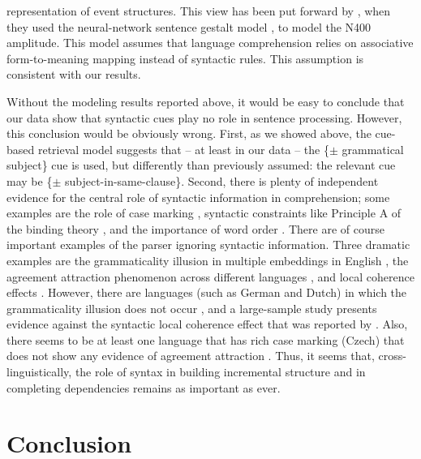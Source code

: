 \documentclass[a4paper, man, floatsintext]{apa7}
\begin{document}
representation of event structures. This view has been put forward by \textcite{rabovsky_etal_2018}, when they used the neural-network sentence gestalt model \parencite{mcclelland1989_sentence_gestalt}, to model the N400 amplitude. This model assumes that language comprehension relies on associative form-to-meaning mapping instead of syntactic rules. This assumption is consistent with our results.

Without the modeling results reported above, it would be easy to conclude that our data show that  syntactic cues play no role in sentence processing. However, this conclusion would be obviously wrong. First, as we showed above, the cue-based retrieval model suggests that -- at least in our data -- the \{$\pm$ grammatical subject\} cue is used, but differently than previously assumed: the relevant cue may be \{$\pm$ subject-in-same-clause\}. Second, there is plenty of independent evidence for the central role of syntactic information in comprehension; some examples are the role of case marking \parencite[e.g.,][]{ALV2019,HusainEtAl2014,bhatia2022processing,bader2000case,bader2006case,miyamoto2002case}, syntactic constraints like Principle A of the binding theory \parencite[e.g.,][]{Sturt2003,dillon2013,yadav2021individual},  and 
the importance of word order \parencite[e.g.,][]{meng2000mode}. There are of course important examples of the parser ignoring syntactic information. Three dramatic examples are the grammaticality illusion in multiple embeddings in English \parencite{gibsonthomas99}, the agreement attraction phenomenon across different languages \parencite{wagersetal,lago_etal_2021,jaeger_etal_2017}, and local coherence effects \parencite{taboretal04}.  However, there are languages (such as German and Dutch) in which the grammaticality illusion does not occur \parencite{VSLK11,FrankEtAl2015}, and a large-sample study \parencite{lcpaape2023} presents evidence against the syntactic local coherence effect that was reported by \textcite{taboretal04}. Also, there seems to be at least one language that has rich case marking (Czech) that does not show any evidence of agreement attraction \parencite{chromy2023number}. Thus, it seems that, cross-linguistically, the role of syntax in building incremental structure and in completing dependencies remains as important as ever.

\section{Conclusion}
\end{document}
